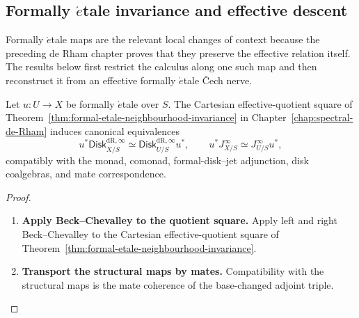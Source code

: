 \subsection{Formally \texorpdfstring{$\acute{e}$}{e}tale invariance and effective descent}
\label{sec:jet-formal-etale}

Formally \(\acute{e}\)tale maps are the relevant local changes of context
because the preceding de Rham chapter proves that they preserve the effective
relation itself. The results below first restrict the calculus along one such
map and then reconstruct it from an effective formally \(\acute{e}\)tale
\v{C}ech nerve.
\begin{theorem}
\label{thm:formal-etale-jets}
Let \(u:U\to X\) be formally \(\acute{e}\)tale over \(S\). The Cartesian
effective-quotient square of
Theorem~\ref{thm:formal-etale-neighbourhood-invariance} in
Chapter~\ref{chap:spectral-de-Rham} induces canonical equivalences
\[
  u^*\mathsf{Disk}^{\mathrm{dR},\infty}_{X/S}
  \simeq
  \mathsf{Disk}^{\mathrm{dR},\infty}_{U/S}u^*,
  \qquad
  u^*J^\infty_{X/S}
  \simeq
  J^\infty_{U/S}u^*,
\]
compatibly with the monad, comonad, formal-disk--jet adjunction, disk
coalgebras, and mate correspondence.
\end{theorem}

\begin{proof}
\leavevmode
\begin{enumerate}[label=\textup{(\arabic*)}]
    \item \textbf{Apply Beck--Chevalley to the quotient square.}
Apply left and right Beck--Chevalley to the Cartesian effective-quotient square
of Theorem~\ref{thm:formal-etale-neighbourhood-invariance}.

    \item \textbf{Transport the structural maps by mates.}
Compatibility with
the structural maps is the mate coherence of the base-changed adjoint triple.
\end{enumerate}
\end{proof}

